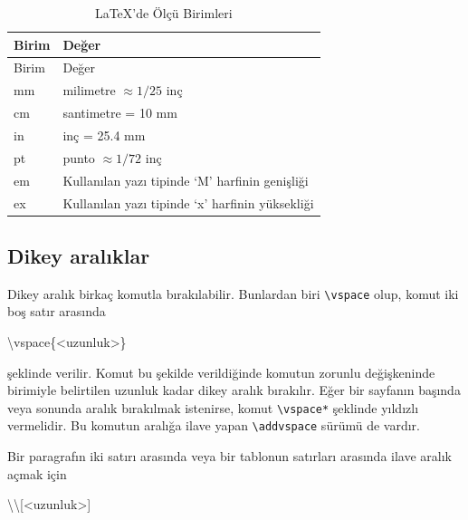 \documentclass[
  10pt,
]{scrbook}
\newenvironment{Shaded}{\begin{snugshade}}{\end{snugshade}}
\newcommand{\FunctionTok}[1]{\textcolor[rgb]{0.00,0.00,0.00}{#1}}
\newcommand{\NormalTok}[1]{#1}
\theoremstyle{definition}
\theoremstyle{definition}
\theoremstyle{definition}
\theoremstyle{definition}
\theoremstyle{remark}
\begin{document}
\begin{longtable}[]{@{}ll@{}}
\caption{\label{tab:olcubir} LaTeX'de Ölçü Birimleri}\tabularnewline
\toprule
Birim & Değer \\
\midrule
\endfirsthead
\toprule
Birim & Değer \\
\midrule
\endhead
mm & milimetre \(\approx 1/25\) inç \\
cm & santimetre = 10 mm \\
in & inç = 25.4 mm \\
pt & punto \(\approx 1/72\) inç \\
em & Kullanılan yazı tipinde `M' harfinin genişliği \\
ex & Kullanılan yazı tipinde `x' harfinin yüksekliği \\
\bottomrule
\end{longtable}

\hypertarget{dikey-aralux131klar}{%
\subsection{Dikey aralıklar}\label{dikey-aralux131klar}}

Dikey aralık birkaç komutla bırakılabilir. Bunlardan biri \texttt{\textbackslash{}vspace} olup, komut iki boş satır arasında

\begin{Shaded}
\begin{Highlighting}[]
\FunctionTok{\textbackslash{}vspace}\NormalTok{\{\textless{}uzunluk\textgreater{}\}}
\end{Highlighting}
\end{Shaded}

şeklinde verilir. Komut bu şekilde verildiğinde komutun zorunlu değişkeninde birimiyle belirtilen uzunluk kadar dikey aralık bırakılır. Eğer bir sayfanın başında veya sonunda aralık bırakılmak istenirse, komut \texttt{\textbackslash{}vspace*} şeklinde yıldızlı vermelidir. Bu komutun aralığa ilave yapan \texttt{\textbackslash{}addvspace} sürümü de vardır.

Bir paragrafın iki satırı arasında veya bir tablonun satırları arasında ilave aralık açmak için

\begin{Shaded}
\begin{Highlighting}[]
\FunctionTok{\textbackslash{}\textbackslash{}}\NormalTok{[\textless{}uzunluk\textgreater{}]}
\end{Highlighting}
\end{Shaded}
\end{document}
